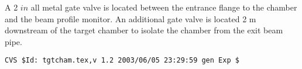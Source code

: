 A 2 $in$ all metal gate valve is located between the entrance flange to the
chamber and the beam profile monitor.   
 An additional gate valve is located 2 m downstream of the
 target chamber to isolate the chamber from the exit beam pipe.

%
%
{\small
\begin{verbatim}CVS $Id: tgtcham.tex,v 1.2 2003/06/05 23:29:59 gen Exp $\end{verbatim}
}
